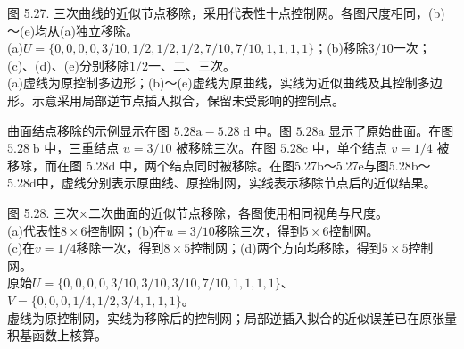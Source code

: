 \documentclass[../main.tex]{subfiles}
\begin{document}
\begin{center}
\begin{minipage}{38cm}
\vspace*{.6\baselineskip}
\centering
\begin{minipage}[b]{12.2cm}
\end{minipage}\hfill
\begin{minipage}[b]{25.2cm}
\end{minipage}
\par\medskip
{}
\par\smallskip
图 5.27. 三次曲线的近似节点移除，采用代表性十点控制网。各图尺度相同，(b)～(e)均从(a)独立移除。\\
(a)$U=\{0,0,0,0,3/10,1/2,1/2,1/2,7/10,7/10,1,1,1,1\}$；(b)移除$3/10$一次；(c)、(d)、(e)分别移除$1/2$一、二、三次。\\
(a)虚线为原控制多边形；(b)～(e)虚线为原曲线，实线为近似曲线及其控制多边形。示意采用局部逆节点插入拟合，保留未受影响的控制点。
\end{minipage}
\end{center}

曲面结点移除的示例显示在图 \({5.28}\mathrm{a} - {5.28}\mathrm{\;d}\) 中。图 \({5.28}\mathrm{a}\) 显示了原始曲面。在图 \({5.28}\mathrm{\;b}\) 中，三重结点 \(u = 3/{10}\) 被移除三次。在图 \({5.28}\mathrm{c}\) 中，单个结点 \(v = 1/4\) 被移除，而在图 5.28d 中，两个结点同时被移除。在图5.27b～5.27e与图5.28b～5.28d中，虚线分别表示原曲线、原控制网，实线表示移除节点后的近似结果。

\begin{center}
\begin{minipage}{25cm}
\vspace*{.6\baselineskip}
\centering
{}
\par\medskip
{}
\par\smallskip
图 5.28. 三次$\times$二次曲面的近似节点移除，各图使用相同视角与尺度。\\
(a)代表性$8\times6$控制网；(b)在$u=3/10$移除三次，得到$5\times6$控制网。\\
(c)在$v=1/4$移除一次，得到$8\times5$控制网；(d)两个方向均移除，得到$5\times5$控制网。\\
原始$U=\{0,0,0,0,3/10,3/10,3/10,7/10,1,1,1,1\}$、$V=\{0,0,0,1/4,1/2,3/4,1,1,1\}$。\\
虚线为原控制网，实线为移除后的控制网；局部逆插入拟合的近似误差已在原张量积基函数上核算。
\end{minipage}
\end{center}
\end{document}
